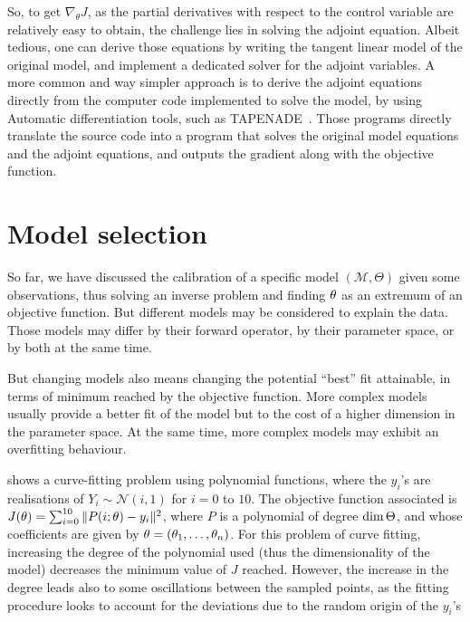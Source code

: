 \documentclass[../../Main_ManuscritThese.tex]{subfiles}
\begin{document}
So, to get $\nabla_\theta J$, as the partial derivatives with respect
to the control variable are relatively easy to obtain, the challenge
lies in solving the adjoint equation. Albeit tedious, one can derive
those equations by writing the tangent linear model of the original
model, and implement a dedicated solver for the adjoint variables. A
more common and way simpler approach is to derive the adjoint
equations directly from the computer code implemented to solve the
model, by using Automatic differentiation tools, such as
\textsc{TAPENADE}~\cite{hascoet_tapenade_2013}. Those programs
directly translate the source code into a program that solves the
original model equations and the adjoint equations, and outputs the
gradient along with the objective function.


\section{Model selection}
\label{sec:model_selection}
So far, we have discussed the calibration of a specific model
$(\mathcal{M}, \Theta)$ given some observations, thus solving an
inverse problem and finding ${\theta}_{\mathrm{}}$ as an extremum of an
objective function. But different models may be considered to explain
the data. Those models may differ by their forward operator, by their
parameter space, or by both at the same time.

But changing models also means changing the potential ``best'' fit attainable, in terms of minimum reached by the objective function.
More complex models usually provide a better fit of the model but to the cost of a higher dimension in the parameter space. At the same time, more complex models may exhibit an overfitting behaviour.

\begin{example}
   shows a curve-fitting problem using
  polynomial functions, where the $y_i$'s are realisations of
  $Y_i \sim \mathcal{N}(i, 1)$ for $i=0$ to $10$. The objective
  function associated is
  $J(\theta) = \sum_{i=0}^{10}\|P(i;\theta) - y_i\|^2$, where $P$ is a
  polynomial of degree $\dim \Theta$, and whose coefficients are
  given by $\theta = (\theta_1,\dots,\theta_n)$.  For this problem of curve
  fitting, increasing the degree of the polynomial used (thus the
  dimensionality of the model) decreases the minimum value of $J$
  reached. However, the increase in the degree leads also to some
  oscillations between the sampled points, as the fitting procedure
  looks to account for the deviations due to the random origin of the
  $y_i$'s
\end{example}
\end{document}

